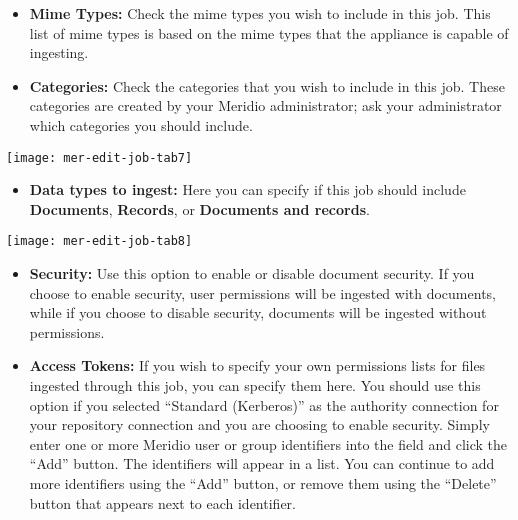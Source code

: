 \begin{itemize}

\item \textbf{Mime Types:} Check the
mime types you wish to include in this job. This list of mime types is
based on the mime types that the appliance is capable of ingesting.

\end{itemize}


\begin{itemize}

\item \textbf{Categories:} Check the categories that you wish to include in this job. These categories are created by your Meridio administrator; ask your administrator which categories you should include.

\end{itemize}

\texttt{[image: mer-edit-job-tab7]}

\begin{itemize}

\item \textbf{Data types to ingest:} 
Here you can specify if this job should include \textbf{Documents},
\textbf{Records}, or \textbf{Documents and records}.
 
\end{itemize}


\texttt{[image: mer-edit-job-tab8]}

\begin{itemize}

\item \textbf{Security:} Use this option to enable or disable document
security. If you choose to enable security, user permissions will be
ingested with documents, while if you choose to disable security,
documents will be ingested without permissions.

\item \textbf{Access Tokens:} \label{ForceACL} If you wish to specify
your own permissions lists for files ingested through this job, you
can specify them here. You should use this option if you selected
``Standard (Kerberos)'' as the authority connection for your
repository connection and you are choosing to enable security. Simply
enter one or more Meridio user or group identifiers into the field and
click the ``Add'' button. The identifiers will appear in a list. You
can continue to add more identifiers using the ``Add'' button, or
remove them using the ``Delete'' button that appears next to each
identifier.

\end{itemize}

